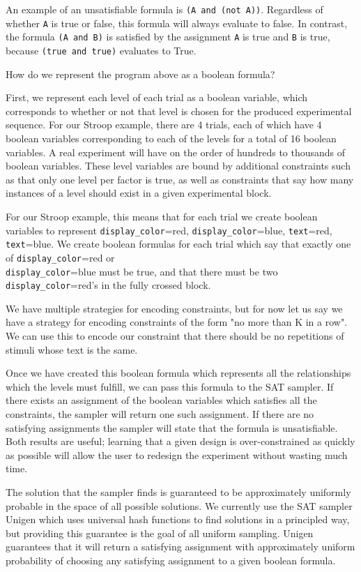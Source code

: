 An example of an unsatisfiable formula is \texttt{(A and (not A))}. Regardless of whether \texttt{A} is true or false, this formula will always evaluate to false. In contrast, the formula \texttt{(A and B)} is satisfied by the assignment \texttt{A} is true and \texttt{B} is true, because \texttt{(true and true)} evaluates to True.

How do we represent the program above as a boolean formula?

First, we represent each level of each trial as a boolean variable, which corresponds to whether or not that level is chosen for the produced experimental sequence. For our Stroop example, there are 4 trials, each of which have 4 boolean variables corresponding to each of the levels for a total of 16 boolean variables. A real experiment will have on the order of hundreds to thousands of boolean variables. These level variables are bound by additional constraints such as that only one level per factor is true, as well as constraints that say how many instances of a level should exist in a given experimental block.

For our Stroop example, this means that for each trial we create boolean variables to represent \texttt{display\_color}=red, \texttt{display\_color}=blue, \texttt{text}=red, \texttt{text}=blue. We create boolean formulas for each trial which say that exactly one of \texttt{display\_color}=red or\\ \texttt{display\_color}=blue must be true, and that there must be two \texttt{display\_color}=red's in the fully crossed block.

We have multiple strategies for encoding constraints, but for now let us say we have a strategy for encoding constraints of the form "no more than K in a row". We can use this to encode our constraint that there should be no repetitions of stimuli whose text is the same.

Once we have created this boolean formula which represents all the relationships which the levels must fulfill, we can pass this formula to the SAT sampler. If there exists an assignment of the boolean variables which satisfies all the constraints, the sampler will return one such assignment. If there are no satisfying assignments the sampler will state that the formula is unsatisfiable. Both results are useful; learning that a given design is over-constrained as quickly as possible will allow the user to redesign the experiment without wasting much time.

The solution that the sampler finds is guaranteed to be approximately uniformly probable in the space of all possible solutions. We currently use the SAT sampler Unigen which uses universal hash functions to find solutions in a principled way, but providing this guarantee is the goal of all uniform sampling. Unigen guarantees that it will return a satisfying assignment with approximately uniform probability of choosing any satisfying assignment to a given boolean formula.

